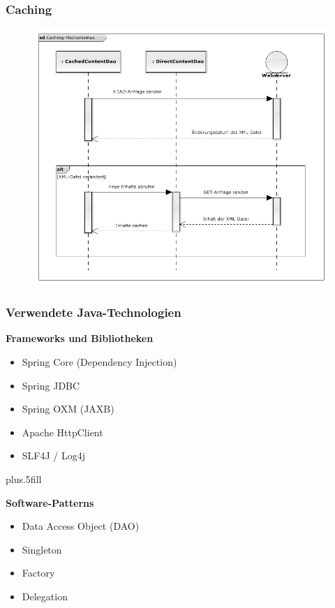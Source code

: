 \documentclass{beamer}
\begin{document}
\begin{frame}
\frametitle{Caching}

\begin{figure}[!h]
\centering
\includegraphics[scale=0.38]{./Abbildungen/Diagram2.png}
\label{fig:sequendiagramm}
\end{figure}

\end{frame}

\begin{frame}
\frametitle{Verwendete Java-Technologien}

\textbf{Frameworks und Bibliotheken}
\begin{itemize}
  \item Spring Core (Dependency Injection)
  \item Spring JDBC
  \item Spring OXM (JAXB)
  \item Apache HttpClient
  \item SLF4J / Log4j
\end{itemize}

\vskip0pt plus.5fill

\textbf{Software-Patterns}
\begin{itemize}
  \item Data Access Object (DAO)
  \item Singleton
  \item Factory
  \item Delegation
\end{itemize}


\end{frame}
\end{document}
